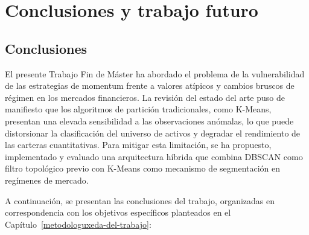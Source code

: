 \newpage
\section{Conclusiones y trabajo futuro}
\label{sec:conclusiones}

\subsection{Conclusiones}
\label{sec:conclusiones_generales}

El presente Trabajo Fin de Máster ha abordado el problema de la 
vulnerabilidad de las estrategias de momentum frente a valores 
atípicos y cambios bruscos de régimen en los mercados financieros. 
La revisión del estado del arte puso de manifiesto que los algoritmos 
de partición tradicionales, como K-Means, presentan una elevada 
sensibilidad a las observaciones anómalas, lo que puede distorsionar 
la clasificación del universo de activos y degradar el rendimiento de 
las carteras cuantitativas. Para mitigar esta limitación, se ha 
propuesto, implementado y evaluado una arquitectura híbrida que 
combina DBSCAN como filtro topológico previo con K-Means como 
mecanismo de segmentación en regímenes de mercado.

A continuación, se presentan las conclusiones del trabajo, organizadas 
en correspondencia con los objetivos específicos planteados en el 
Capítulo~\ref{metodologuxeda-del-trabajo}:

